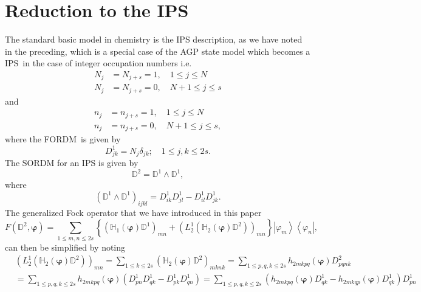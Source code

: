 \documentclass[aps,preprint]{revtex4}%
\begin{document}
\section{Reduction to the IPS \label{IPS}}

The standard basic model in chemistry is the IPS description, as we have noted
in the preceding, which is a special case of the AGP state model which becomes
a IPS\ in the case of integer occupation numbers i.e.
\begin{align}
N_{j} &  =N_{j+s}=1,\quad1\leq j\leq N\nonumber\\
N_{j} &  =N_{j+s}=0,\quad N+1\leq j\leq s
\end{align}
and%
\begin{align}
n_{j} &  =n_{j+s}=1,\quad1\leq j\leq N\nonumber\\
n_{j} &  =n_{j+s}=0,\quad N+1\leq j\leq s,
\end{align}
where the FORDM\ is given by
\begin{equation}
D_{jk}^{1}=N_{j}\delta_{jk};\quad1\leq j,k\leq2s.
\end{equation}
The SORDM for an IPS is given by
\begin{equation}
\mathbb{D}^{2}=\mathbb{D}^{1}\wedge\mathbb{D}^{1},
\end{equation}
where
\begin{equation}
\left(  \mathbb{D}^{1}\wedge\mathbb{D}^{1}\right)  _{ijkl}=D_{ik}^{1}%
D_{jl}^{1}-D_{il}^{1}D_{jk}^{1}.
\end{equation}
The generalized Fock operator that we have introduced in this paper
\begin{equation}
F\left(  \mathbb{D}^{2},\mathbf{\varphi}\right)  =\sum_{1\leq m,n\leq
2s}\left\{  \left(  \mathbb{H}_{1}\left(  \mathbf{\varphi}\right)
\mathbb{D}^{1}\right)  _{mn}+\left(  L_{2}^{1}\left(  \mathbb{H}_{2}\left(
\mathbf{\varphi}\right)  \mathbb{D}^{2}\right)  \right)  _{mn}\right\}
\left\vert \varphi_{m}\right\rangle \left\langle \varphi_{n}\right\vert
,\label{F1}%
\end{equation}
can then be simplified by noting
\begin{align}
&  \left(  L_{2}^{1}\left(  \mathbb{H}_{2}\left(  \mathbf{\varphi}\right)
\mathbb{D}^{2}\right)  \right)  _{mn}=\sum_{1\leq k\leq2s}\left(
\mathbb{H}_{2}\left(  \mathbf{\varphi}\right)  \mathbb{D}^{2}\right)
_{mknk}=\sum_{1\leq p,q,k\leq2s}h_{2mkpq}\left(  \mathbf{\varphi}\right)
D_{pqnk}^{2}\nonumber\\
&  =\sum_{1\leq p,q,k\leq2s}h_{2mkpq}\left(  \mathbf{\varphi}\right)  \left(
D_{pn}^{1}D_{qk}^{1}-D_{pk}^{1}D_{qn}^{1}\right)  =\sum_{1\leq p,q,k\leq
2s}\left(  h_{2mkpq}\left(  \mathbf{\varphi}\right)  D_{qk}^{1}-h_{2mkqp}%
\left(  \mathbf{\varphi}\right)  D_{qk}^{1}\right)  D_{pn}^{1}%
\end{align}
\end{document}
